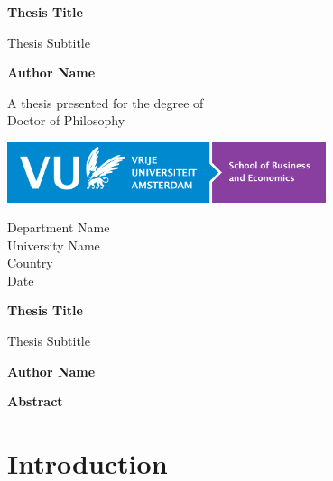 \documentclass[11pt,a4paper]{article}
\theoremstyle{plain}
\theoremstyle{definition}
\begin{document}
\begin{titlepage}
    \begin{center}
        \vspace*{1cm}
        
        \Huge
        \textbf{Thesis Title}
        
        \vspace{0.5cm}
        \LARGE
        Thesis Subtitle
        
        \vspace{1.5cm}
        
        \textbf{Author Name}
        
        \vfill
        
        A thesis presented for the degree of\\
        Doctor of Philosophy
        
        \vspace{0.8cm}
        
        \includegraphics[width=0.7\textwidth]{LogoSBE.png}
        
        \Large
        Department Name\\
        University Name\\
        Country\\
        Date
        
    \end{center}
\end{titlepage}

\tableofcontents


\thispagestyle{plain}
\begin{center}
    \Large
    \textbf{Thesis Title}
    
    \vspace{0.4cm}
    \large
    Thesis Subtitle
    
    \vspace{0.4cm}
    \textbf{Author Name}
    
    \vspace{0.9cm}
    \textbf{Abstract}
\end{center}
\blindtext
\newpage

\section{Introduction}



\end{document}

